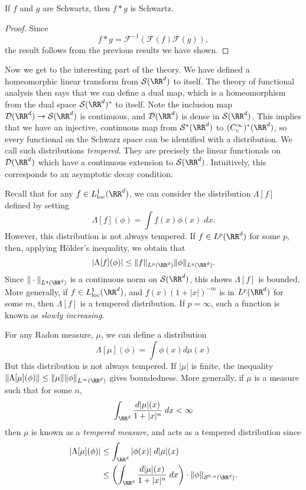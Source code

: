 \begin{corollary}
    If $f$ and $g$ are Schwartz, then $f * g$ is Schwartz.
\end{corollary}
\begin{proof}
    Since
    \[ f * g = \mathcal{F}^{-1}(\mathcal{F}(f) \mathcal{F}(g)), \]
    the result follows from the previous results we have shown.
\end{proof}

Now we get to the interesting part of the theory. We have defined a homeomorphic linear transform from $\mathcal{S}(\RR^d)$ to itself. The theory of functional analysis then says that we can define a dual map, which is a homeomorphism from the dual space $\mathcal{S}(\RR^d)^*$ to itself. Note the inclusion map $\mathcal{D}(\RR^d) \to \mathcal{S}(\RR^d)$ is continuous, and $\mathcal{D}(\RR^d)$ is dense in $\mathcal{S}(\RR^d)$. This implies that we have an injective, continuous map from $\mathcal{S}^*(\RR^d)$ to $(C_c^\infty)^*(\RR^d)$, so every functional on the Schwarz space can be identified with a distribution. We call such distributions \emph{tempered}. They are precisely the linear functionals on $\mathcal{D}(\RR^d)$ which have a continuous extension to $\mathcal{S}(\RR^d)$. Intuitively, this corresponds to an asymptotic decay condition.

\begin{example}
    Recall that for any $f \in L^1_{\text{loc}}(\RR^d)$, we can consider the distribution $\Lambda[f]$ defined by setting
    \[ \Lambda[f](\phi) = \int f(x) \phi(x)\; dx. \]
    However, this distribution is not always tempered. If $f \in L^p(\RR^d)$ for some $p$, then, applying H\"{o}lder's inequality, we obtain that
    \[ |\Lambda[f](\phi)| \leq \| f \|_{L^p(\RR^d)} \| \phi \|_{L^q(\RR^d)}. \]
    Since $\| \cdot \|_{L^q(\RR^d)}$ is a continuous norm on $\mathcal{S}(\RR^d)$, this shows $\Lambda[f]$ is bounded. More generally, if $f \in L^1_{\text{loc}}(\RR^d)$, and $f(x) (1 + |x|)^{-m}$ is in $L^p(\RR^d)$ for some $m$, then $\Lambda[f]$ is a tempered distribution. If $p = \infty$, such a function is known as \emph{slowly increasing}.
\end{example}

\begin{example}
    For any Radon measure, $\mu$, we can define a distribution
    \[ \Lambda[\mu](\phi) = \int \phi(x) d\mu(x) \]
    But this distribution is not always tempered. If $|\mu|$ is finite, the inequality $\| \Lambda[\mu](\phi) \| \leq \| \mu \| \| \phi \|_{L^\infty(\RR^d)}$ gives boundedness. More generally, if $\mu$ is a measure such that for some $n$,
    \[ \int_{\RR^d} \frac{d|\mu|(x)}{1 + |x|^n}\; dx < \infty \]
    then $\mu$ is known as a \emph{tempered measure}, and acts as a tempered distribution since
    \begin{align*}
      |\Lambda[\mu](\phi)| &\leq \int_{\RR^d} |\phi(x)|\; d|\mu|(x)\\
      &\leq \left( \int_{\RR^d} \frac{d|\mu|(x)}{1 + |x|^n}\; dx \right) \cdot \| \phi \|_{\mathcal{S}^{0,n}(\RR^d)}.
    \end{align*}
\end{example}

